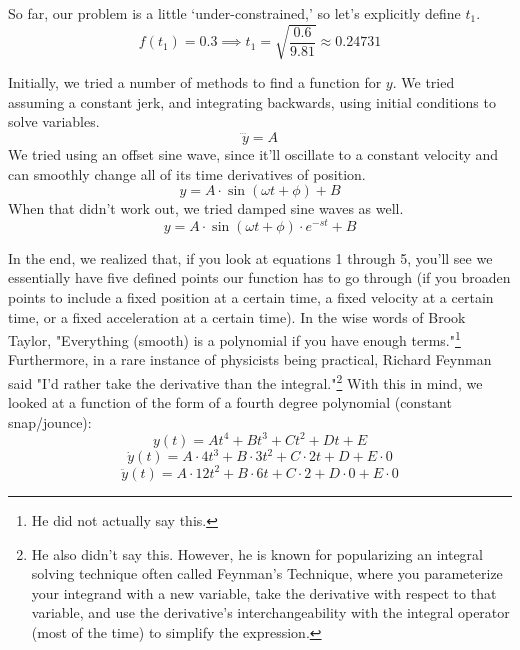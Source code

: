 \documentclass[nofoot,pdf-a,balance,colorlinks,upint,subscriptcorrection,varvw,mathalfa=cal=boondoxo]{asmeconf}
\begin{document}
         So far, our problem is a little `under-constrained,' so let's explicitly define $t_1$.
         \begin{equation} 
             f(t_1) = 0.3 \implies t_1 = \sqrt{\frac{0.6}{9.81}} \approx 0.24731
         \end{equation}
     
       Initially, we tried a number of methods to find a function for $y$. We tried assuming a constant jerk, and integrating backwards, using initial conditions to solve variables. 
    \begin{equation*}
        \dddot{y} = A
    \end{equation*}
        We tried using an offset sine wave, since it'll oscillate to a constant velocity and can smoothly change all of its time derivatives of position.
    \begin{equation*}
        y = A \cdot \sin{\left(\omega t + \phi\right)} + B
    \end{equation*}
        When that didn't work out, we tried damped sine waves as well.
    \begin{equation*}
        y = A \cdot \sin{\left(\omega t + \phi\right)}\cdot e^{-st} + B
    \end{equation*}

    In the end, we realized that, if you look at equations 1 through 5, you'll see we essentially have five defined points our function has to go through (if you broaden points to include a fixed position at a certain time, a fixed velocity at a certain time, or a fixed acceleration at a certain time). In the wise words of Brook Taylor, "Everything (smooth) is a polynomial if you have enough terms."\footnote{He did not actually say this.} Furthermore, in a rare instance of physicists being practical, Richard Feynman said "I'd rather take the derivative than the integral."\footnote{He also didn't say this. However, he is known for popularizing an integral solving technique often called Feynman's Technique, where you parameterize your integrand with a new variable, take the derivative with respect to that variable, and use the derivative's interchangeability with the integral operator (most of the time) to simplify the expression.}  With this in mind, we looked at a function of the form of a fourth degree polynomial (constant snap/jounce):
    \begin{equation}
        y\left(t\right) = At^4 + Bt^3 + Ct^2 + Dt + E
    \end{equation}
    \begin{equation}
        \dot{y}\left(t\right) = A\cdot4t^3 + B\cdot 3t^2 + C \cdot 2t + D + E\cdot 0
    \end{equation}
    \begin{equation}
        \ddot{y}\left(t\right) = A\cdot12t^2 + B\cdot 6t + C \cdot 2 + D\cdot0 + E\cdot 0
    \end{equation}
\end{document}
